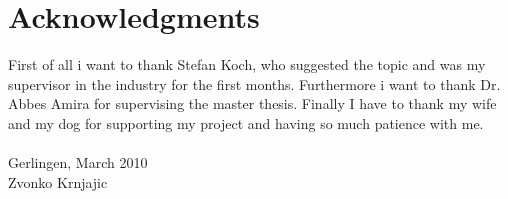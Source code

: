 \thispagestyle{empty}

\begingroup
\section*{Acknowledgments}
First of all i want to thank Stefan Koch, who suggested the topic and was my
supervisor in the industry for the first months. Furthermore i want to thank Dr.
Abbes Amira for supervising the master thesis. Finally I have to thank my wife
and my dog for supporting my project and having so much patience with me.\\\\
 
\noindent Gerlingen, March 2010\\

\noindent Zvonko Krnjajic

\endgroup



